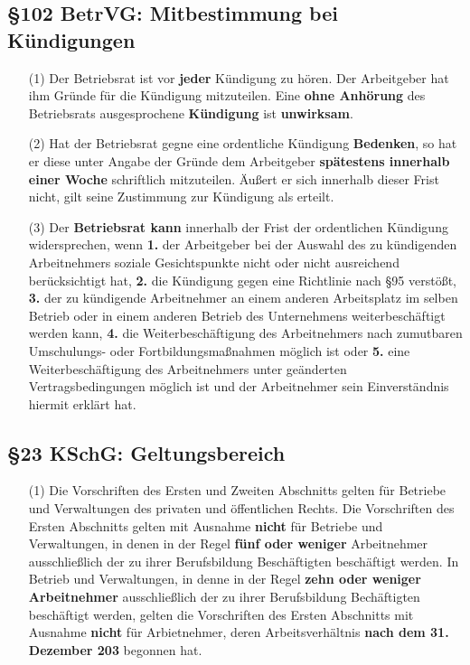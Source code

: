 \documentclass[a4paper, 12pt]{report}
\begin{document}
\newpage
\subsection{\S 102 BetrVG: Mitbestimmung bei Kündigungen}

\begin{itemize}
    \item[(1)] Der Betriebsrat ist vor \textbf{jeder} Kündigung zu hören. Der
	Arbeitgeber hat ihm Gründe für die Kündigung mitzuteilen. Eine
	\textbf{ohne Anhörung} des Betriebsrats ausgesprochene
	\textbf{Kündigung} ist \textbf{unwirksam}.
    \item[(2)] Hat der Betriebsrat gegne eine ordentliche Kündigung
	\textbf{Bedenken}, so hat er diese unter Angabe der Gründe dem
	Arbeitgeber \textbf{spätestens innerhalb einer Woche} schriftlich
	mitzuteilen. Äußert er sich innerhalb dieser Frist nicht, gilt seine
	Zustimmung zur Kündigung als erteilt.
    \item[(3)] Der \textbf{Betriebsrat kann} innerhalb der Frist der
	ordentlichen Kündigung widersprechen, wenn \textbf{1.} der Arbeitgeber
	bei der Auswahl des zu kündigenden Arbeitnehmers soziale Gesichtspunkte
	nicht oder nicht ausreichend berücksichtigt hat, \textbf{2.} die
	Kündigung gegen eine Richtlinie nach \S 95 verstößt, \textbf{3.} der
	zu kündigende Arbeitnehmer an einem anderen Arbeitsplatz im selben
	Betrieb oder in einem anderen Betrieb des Unternehmens weiterbeschäftigt
	werden kann, \textbf{4.} die Weiterbeschäftigung des Arbeitnehmers nach
	zumutbaren Umschulungs- oder Fortbildungsmaßnahmen möglich ist oder
	\textbf{5.} eine Weiterbeschäftigung des Arbeitnehmers unter geänderten
	Vertragsbedingungen möglich ist und der Arbeitnehmer sein Einverständnis
	hiermit erklärt hat.
\end{itemize}

\subsection{\S 23 KSchG: Geltungsbereich}

\begin{itemize}
    \item[(1)] Die Vorschriften des Ersten und Zweiten Abschnitts gelten für
	Betriebe und Verwaltungen des privaten und öffentlichen Rechts. Die
	Vorschriften des Ersten Abschnitts gelten mit Ausnahme \textbf{nicht}
	für Betriebe und Verwaltungen, in denen in der Regel
	\textbf{fünf oder weniger} Arbeitnehmer ausschließlich der zu ihrer
	Berufsbildung Beschäftigten beschäftigt werden. In Betrieb und
	Verwaltungen, in denne in der Regel \textbf{zehn oder weniger
	Arbeitnehmer} ausschließlich der zu ihrer Berufsbildung Bechäftigten
	beschäftigt werden, gelten die Vorschriften des Ersten Abschnitts mit
	Ausnahme \textbf{nicht} für Arbietnehmer, deren Arbeitsverhältnis
	\textbf{nach dem 31. Dezember 203} begonnen hat.
\end{itemize}
\end{document}
